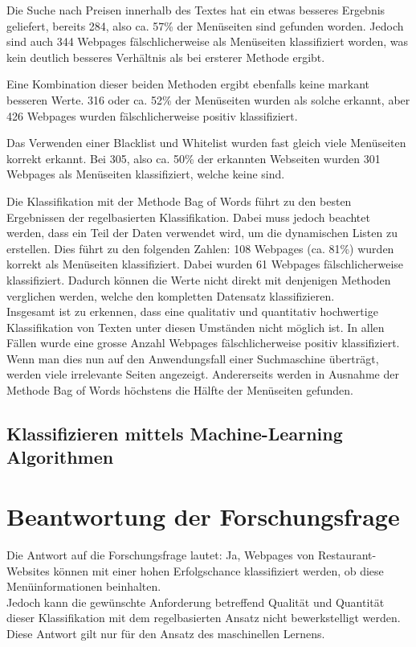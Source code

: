 Die Suche nach Preisen innerhalb des Textes hat ein etwas besseres Ergebnis geliefert, bereits 284, also ca. 57\% der Menüseiten sind gefunden worden. 
Jedoch sind auch 344 Webpages fälschlicherweise als Menüseiten klassifiziert worden, was kein deutlich besseres Verhältnis als bei ersterer Methode ergibt.

Eine Kombination dieser beiden Methoden ergibt ebenfalls keine markant besseren Werte.
316 oder ca. 52\% der Menüseiten wurden als solche erkannt, aber 426 Webpages wurden fälschlicherweise positiv klassifiziert.

Das Verwenden einer Blacklist und Whitelist wurden fast gleich viele Menüseiten korrekt erkannt. Bei 305, also ca. 50\% der erkannten Webseiten wurden 301  Webpages als Menüseiten klassifiziert, welche keine sind.

Die Klassifikation mit der Methode \glqq Bag of Words\grqq{} führt zu den besten Ergebnissen der regelbasierten Klassifikation.
Dabei muss jedoch beachtet werden, dass ein Teil der Daten verwendet wird, um die dynamischen Listen zu erstellen.
Dies führt zu den folgenden Zahlen: 108 Webpages (ca. 81\%) wurden korrekt als Menüseiten klassifiziert.
Dabei wurden 61 Webpages fälschlicherweise klassifiziert.
Dadurch können die Werte nicht direkt mit denjenigen Methoden verglichen werden, welche den kompletten Datensatz klassifizieren. \\

Insgesamt ist zu erkennen, dass eine qualitativ und quantitativ hochwertige Klassifikation von Texten unter diesen Umständen nicht möglich ist.
In allen Fällen wurde eine grosse Anzahl Webpages fälschlicherweise positiv klassifiziert.
Wenn man dies nun auf den Anwendungsfall einer Suchmaschine überträgt, werden viele irrelevante Seiten angezeigt.
Andererseits werden in Ausnahme der Methode \glqq Bag of Words\grqq{} höchstens die Hälfte der Menüseiten gefunden.
\subsection{Klassifizieren mittels Machine-Learning Algorithmen}
\section{Beantwortung der Forschungsfrage}
Die Antwort auf die Forschungsfrage lautet: Ja, Webpages von Restaurant-Websites können mit einer hohen Erfolgschance klassifiziert werden, ob diese Menüinformationen beinhalten.\\
Jedoch kann die gewünschte Anforderung betreffend Qualität und Quantität dieser Klassifikation mit dem regelbasierten Ansatz nicht bewerkstelligt werden.
Diese Antwort gilt nur für den Ansatz des maschinellen Lernens.
